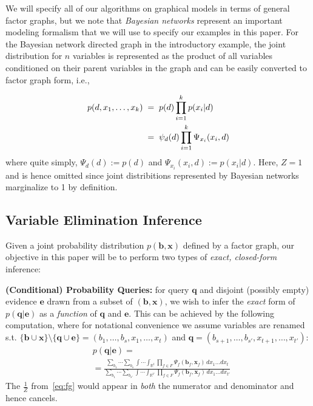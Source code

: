 \documentclass[letterpaper]{article}
\renewcommand{\vec}[1]{\mathbf{#1}}
\begin{document}
We will specify all of our algorithms on graphical models in terms of 
general factor graphs, but we note that \emph{Bayesian networks} represent
an important modeling formalism that we will use to specify our examples
in this paper.  For the Bayesian network directed graph 
in the introductory example, the joint distribution
for $n$ variables is represented as the product of all variables
conditioned on their parent variables in the graph and can be
easily converted to factor graph form, i.e., 
{{\footnotesize
\vspace{-2mm}
\begin{align}
p(d,x_1,\ldots,x_k) \; & = \; p(d) \prod_{i=1}^k p(x_i|d) \nonumber \\
& = \; \psi_d(d) \prod_{i=1}^k \Psi_{x_i} (x_i,d) \label{eq:bn}
\vspace{-1mm}
\end{align}
}
where quite simply, $\Psi_{d} (d) := p(d)$ and $\Psi_{x_i} (x_i,d) :=
p(x_i|d)$.  Here, $Z=1$ and is hence omitted since joint distribitions
represented by Bayesian networks marginalize to 1 by definition.


\subsection{Variable Elimination Inference}

Given a joint probability distribution $p(\vec{b},\vec{x})$
defined by a factor graph, our objective in this paper will
be to perform two types of \emph{exact, closed-form} inference:

{\bf (Conditional) Probability Queries:} for query
$\vec{q}$ and disjoint (possibly empty) 
evidence $\vec{e}$ drawn from 
a subset of $(\vec{b},\vec{x})$, we wish to infer 
the \emph{exact}
form of $p(\vec{q}|\vec{e})$ as a \emph{function} of 
$\vec{q}$ and $\vec{e}$.  This can be 
achieved by the following computation, where 
for notational convenience we assume variables are renamed s.t. 
$\{ \vec{b} \cup \vec{x} \} \setminus \{ \vec{q} \cup \vec{e} \} = ( b_1,\ldots,b_s,x_1,\ldots,x_t)$ and 
$\vec{q} = (b_{s+1},\ldots,b_{s'},x_{t+1},\ldots,x_{t'})$:
{\footnotesize
\begin{align}
& p(\vec{q}|\vec{e}) = \label{eq:cprob}\\
& = \frac{\sum_{b_1} \cdots \sum_{b_s} \int \cdots \int_{\mathbb{R}^t} \prod_{f \in F} \Psi_f(\vec{b}_f,\vec{x}_f) \, dx_1 \ldots dx_t}
{\sum_{b_1} \cdots \sum_{b_{s'}} \int \cdots \int_{\mathbb{R}^{t'}} \prod_{f \in F} \Psi_f(\vec{b}_f,\vec{x}_f) \, dx_1 \ldots dx_{t'}} \nonumber
\end{align}
}
The $\frac{1}{Z}$ from~\eqref{eq:fg} would appear in \emph{both}
the numerator and denominator and hence cancels.

}
\end{document}
